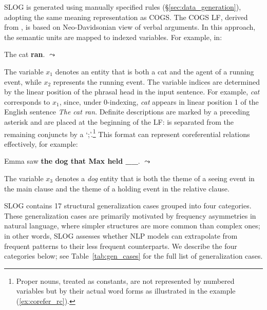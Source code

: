 

SLOG is generated using manually specified rules (\S\ref{sec:data_generation}), adopting the same meaning representation as COGS. The COGS \ac{LF}, derived from \cite{reddy-etal-2017-universal}, is based on Neo-Davidsonian view of verbal arguments. In this approach, the semantic units are mapped to indexed variables. For example, in: 
\vspace{-0.5\baselineskip}
\begin{exe}
    \ex The cat \textbf{ran}. \newline $\leadsto$  
\end{exe}
\vspace{-0.5\baselineskip}
The variable \texttt{$x_1$} denotes an entity that is both a cat and the agent of a running event, while \texttt{$x_2$} represents the running event. The variable indices are determined by the linear position of the phrasal head in the input sentence. For example, \textit{cat} corresponds to $x_1$, since, under 0-indexing, \textit{cat} appears in linear position 1 of the English sentence \textit{The cat ran}. Definite descriptions are marked by a preceding asterisk and are placed at the beginning of the LF:  is separated from the remaining conjuncts by a `;'.\footnote{Proper nouns, treated as constants, are not represented by numbered variables but by their actual word forms as illustrated in the example (\ref{ex:corefer_rc}).} This format can represent coreferential relations effectively, for example:
\begin{exe}
    \ex \label{ex:corefer_rc} Emma saw \textbf{the dog that Max held \_\_}. $\leadsto$  \newline 
\end{exe}
The variable \texttt{$x_3$} denotes a \textit{dog} entity that is both the theme of a seeing event in the main clause and the theme of a holding event in the relative clause.



SLOG contains 17 structural generalization cases grouped into four categories. These generalization cases are primarily motivated by frequency asymmetries in natural language, where simpler structures are more common than complex ones; in other words, SLOG assesses whether NLP models can extrapolate from frequent patterns to their less frequent counterparts. We describe the four categories below; see Table~\ref{tab:gen_cases} for the full list of generalization cases.



